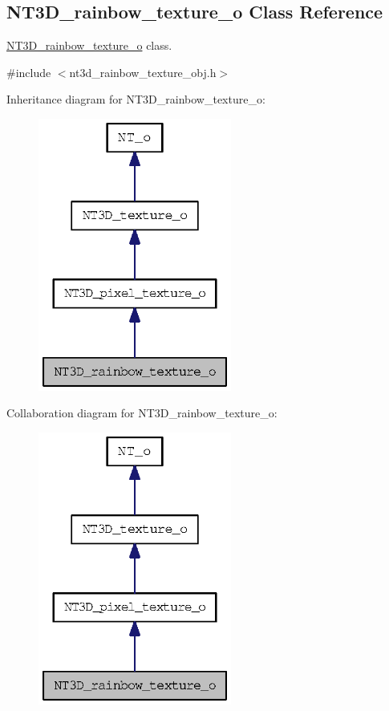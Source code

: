 \subsection{NT3D\_\-rainbow\_\-texture\_\-o Class Reference}
\label{class_n_t3_d__rainbow__texture__o}


\hyperlink{class_n_t3_d__rainbow__texture__o}{NT3D\_\-rainbow\_\-texture\_\-o} class.  




{\ttfamily \#include $<$nt3d\_\-rainbow\_\-texture\_\-obj.h$>$}



Inheritance diagram for NT3D\_\-rainbow\_\-texture\_\-o:
\nopagebreak
\begin{figure}[H]
\begin{center}
\leavevmode
\includegraphics[width=180pt]{class_n_t3_d__rainbow__texture__o__inherit__graph}
\end{center}
\end{figure}


Collaboration diagram for NT3D\_\-rainbow\_\-texture\_\-o:
\nopagebreak
\begin{figure}[H]
\begin{center}
\leavevmode
\includegraphics[width=180pt]{class_n_t3_d__rainbow__texture__o__coll__graph}
\end{center}
\end{figure}
